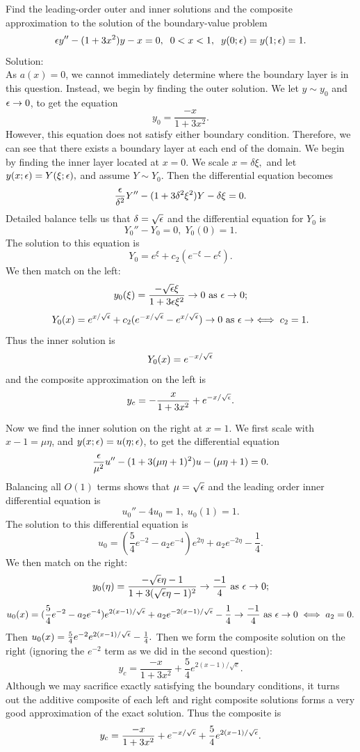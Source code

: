 \item Find the leading-order outer and inner solutions and the composite approximation to the solution of the boundary-value problem
%
$$\epsilon y'' - (1+3x^2)y -x = 0,\;\; 0<x<1,\;\;y(0;\epsilon)=y(1;\epsilon)=1. $$
%
Solution:\\

As $a(x)=0$, we cannot immediately determine where the boundary layer is in this question. Instead, we begin by finding the outer solution. We let $y\sim y_0$ and $\epsilon\to 0$, to get the equation
$$y_0=\frac{-x}{1+3x^2}.$$
However, this equation does not satisfy either boundary condition. Therefore, we can see that there exists a boundary layer at each end of the domain. We begin by finding the inner layer located at $x=0.$ We scale $x=\delta \xi,$ and let $y(x;\epsilon)=Y(\xi;\epsilon),$ and assume $Y\sim Y_0$. Then the differential equation becomes
$$\frac{\epsilon}{\delta^2}Y''-(1+3\delta^2\xi^2)Y-\delta \xi=0.$$
Detailed balance tells us that $\delta=\sqrt{\epsilon}$ and the differential equation for $Y_0$ is
$$Y_0''-Y_0=0, \; Y_0(0)=1.$$
The solution to this equation is
$$Y_0=e^\xi+c_2(e^{-\xi}-e^\xi).$$
We then match on the left:
$$y_0(\xi)=\frac{-\sqrt{\epsilon}\xi}{1+3\epsilon\xi^2}\to 0\text{ as }\epsilon\to 0;$$
$$Y_0(x)=e^{x/\sqrt{\epsilon}}+c_2(e^{-x/\sqrt{\epsilon}}-e^{x/\sqrt{\epsilon}})\to 0\text{ as }\epsilon\to \iff c_2=1.$$
Thus the inner solution is
$$Y_0(x)=e^{-x/\sqrt{\epsilon}}$$
and the composite approximation on the left is
$$y_c=-\frac{x}{1+3x^2}+e^{-x/\sqrt{\epsilon}}.$$

Now we find the inner solution on the right at $x=1.$ We first scale with $x-1=\mu\eta$, and $y(x;\epsilon)=u(\eta;\epsilon)$, to get the differential equation
$$\frac{\epsilon}{\mu^2}u''-(1+3(\mu\eta+1)^2)u-(\mu\eta+1)=0.$$
Balancing all $O(1)$ terms shows that $\mu=\sqrt{\epsilon}$ and the leading order inner differential equation is
$$u_0''-4u_0=1, \; u_0(1)=1.$$
The solution to this differential equation is
$$u_0=(\frac{5}{4}e^{-2}-a_2e^{-4})e^{2\eta}+a_2e^{-2\eta}-\frac{1}{4}.$$
We then match on the right:
$$y_0(\eta)=\frac{-\sqrt{\epsilon}\eta-1}{1+3(\sqrt{\epsilon}\eta-1)^2}\to\frac{-1}{4}\text{ as }\epsilon\to 0;$$
$$u_0(x)=(\frac{5}{4}e^{-2}-a_2e^{-4})e^{2(x-1)/\sqrt{\epsilon}}+a_2e^{-2(x-1)/\sqrt{\epsilon}}-\frac{1}{4}\to \frac{-1}{4}\text{ as }\epsilon\to 0\iff a_2=0.$$
Then $u_0(x)=\frac{5}{4}e^{-2}e^{2(x-1)/\sqrt{\epsilon}}-\frac{1}{4}.$
Then we form the composite solution on the right (ignoring the $e^{-2}$ term as we did in the second question):
$$y_c=\frac{-x}{1+3x^2}+\frac{5}{4}e^{2(x-1)/\sqrt{e}}.$$
Although we may sacrifice exactly satisfying the boundary conditions, it turns out the additive composite of each left and right composite solutions forms a very good approximation of the exact solution. Thus the composite is
$$y_c=\frac{-x}{1+3x^2}+e^{-x/\sqrt{\epsilon}}+\frac{5}{4}e^{2(x-1)/\sqrt{\epsilon}}.$$


